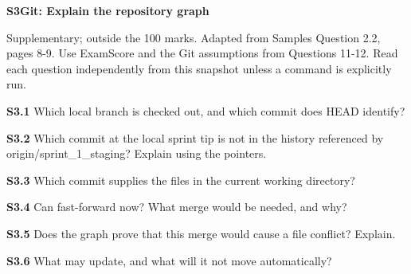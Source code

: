 \blankbox{13cm}
\newpage
\textbf{\Large S3\quad Git: Explain the repository graph}\par
Supplementary; outside the 100 marks. Adapted from Samples Question 2.2, pages 8-9. Use ExamScore and the Git assumptions from Questions 11-12. Read each question independently from this snapshot unless a command is explicitly run.\par
\begin{center}\supplementgitgraph\end{center}
\textbf{S3.1} Which local branch is checked out, and which commit does HEAD identify?\par
\blankbox{1.5cm}
\textbf{S3.2} Which commit at the local sprint tip is not in the history referenced by origin/sprint\_1\_staging? Explain using the pointers.\par
\blankbox{1.8cm}
\textbf{S3.3} Which commit supplies the files in the current working directory?\par
\blankbox{1.5cm}
\textbf{S3.4} Can  fast-forward now? What merge would be needed, and why?\par
\blankbox{2cm}
\textbf{S3.5} Does the graph prove that this merge would cause a file conflict? Explain.\par
\blankbox{1.5cm}
\textbf{S3.6} What may  update, and what will it not move automatically?\par
\blankbox{2cm}
